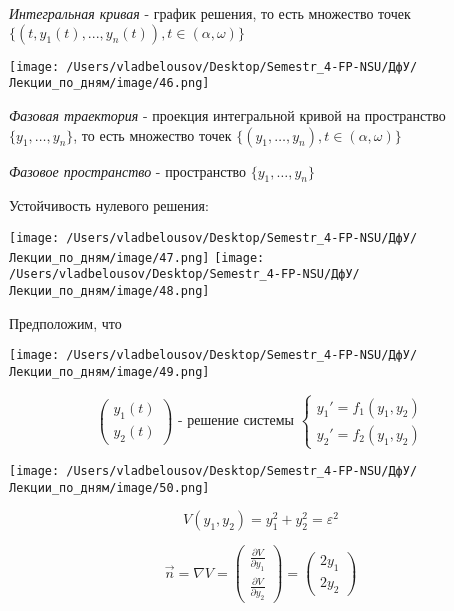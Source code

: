 \documentclass[12pt, a4paper]{report}
\begin{document}
\textit{Интегральная кривая}  - график решения, то есть множество точек \( \{(t,y_1(t ),..., y_n(t)), t \in  (\alpha , \omega)\} \) 

\begin{center}
    \texttt{[image: /Users/vladbelousov/Desktop/Semestr\_4-FP-NSU/ДфУ/Лекции\_по\_дням/image/46.png]}
\end{center}

\textit{Фазовая траектория} - проекция интегральной кривой на пространство \( \{y_1, \ldots, y_n\} \), то есть множество точек \( \{(y_1, \ldots, y_n ) , t \in (\alpha , \omega)\} \) 

\textit{Фазовое пространство} - пространство \( \{y_1, \ldots, y_n\} \)  

Устойчивость нулевого решения: 

\begin{center}
    \texttt{[image: /Users/vladbelousov/Desktop/Semestr\_4-FP-NSU/ДфУ/Лекции\_по\_дням/image/47.png]}
    \texttt{[image: /Users/vladbelousov/Desktop/Semestr\_4-FP-NSU/ДфУ/Лекции\_по\_дням/image/48.png]}
\end{center}

Предположим, что 

\begin{center}
    \texttt{[image: /Users/vladbelousov/Desktop/Semestr\_4-FP-NSU/ДфУ/Лекции\_по\_дням/image/49.png]}
\end{center}

\[ \begin{pmatrix}
y_1(t)\\
y_2(t)
\end{pmatrix} \text{ - решение системы } \begin{cases}
y_1 ' = f_1 (y_1,y_2) \\ 
y_2' = f_2 (y_1 , y_2)
\end{cases} \] 

\begin{center}
    \texttt{[image: /Users/vladbelousov/Desktop/Semestr\_4-FP-NSU/ДфУ/Лекции\_по\_дням/image/50.png]}
\end{center}

\[ V(y_1, y_2 ) = y_1 ^2 + y_2 ^2  = \varepsilon ^2  \] 

\[ \vec{n }  = \nabla V = \begin{pmatrix}
\displaystyle  \frac{ \partial  V }{\partial  y_1 }  \\[10pt]
\displaystyle  \frac{\partial  V }{\partial  y_2 } 
\end{pmatrix}= \begin{pmatrix}
2 y_1 \\
2 y_2 
\end{pmatrix} \] 
\end{document}
